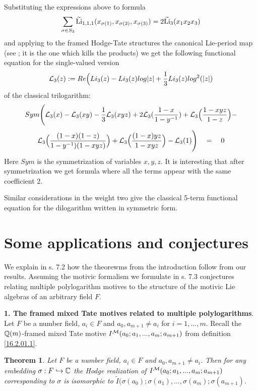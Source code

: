\documentclass[10pt]{article}
\newtheorem{theorem}{Theorem}[section]
\begin{document}
Substituting the expressions above to  formula
$$%
\sum _{\sigma \in S_{3}} {{\widetilde {\rm Li}}}_{1,1,1}(x_{\sigma(1)},x_{\sigma(2)},
x_{\sigma(3)}) = 2 {{\widetilde {\rm Li}}}_{3}(x_1 x_2 x_3) 
$$%
and applying to the framed Hodge-Tate structures the canonical Lie-period map (see \cite{BD1}; it is 
the one which kills the products)
we get the following functional equation for the single-valued version 
$$
{\cal L}_3(z):= Re\Bigl( Li_3(z) -
 Li_3(z)log|z| + \frac{1}{3} Li_3(z)log^2(|z|)
$$
of the classical trilogarithm:
\begin{equation} \label{3.5*}
Sym\Biggr(  {\cal L}_3 (x) -   {\cal L}_3 (xy) - \frac{1}{3}  {\cal L}_3 (xyz) + 2  {\cal L}_3 (\frac{1-x}{1-y^{-1}}) +   {\cal L}_3 \Bigl(\frac{1-xyz}{1-z}\Bigr) - 
\end{equation}
$$
  {\cal L}_3 \Bigl(
\frac{(1-x)(1-z)}{1-y^{-1})(1-xyz)}\Bigr) +   {\cal L}_3 \Bigr(\frac
{(1-x)yz}{1-xyz}\Bigr) - {\cal L}_3(1) \Biggr) \quad = \quad 0
$$
Here $Sym$ is the symmetrization of variables $x,y,z$. It is
interesting that after symmetrization we get formula where all
the terms appear with the same coefficient $2$.


Similar considerations in the weight two give the classical 
 5-term functional equation for the dilogarithm written in symmetric form.


\section{Some applications and conjectures}
 

We explain in s. 7.2 how the theorewms from the introduction follow from our results. 
Assuming the motivic formalism we formulate in s. 7.3 
 conjectures relating multiple polylogarithm motives to the structure of
 the motivic Lie algebras of an 
arbitrary field $F$. 


{\bf 1. The framed mixed Tate  motives  related  to multiple polylogarithms}. Let $F$ be  a number field,   $a_i \in F$ 
 and $a_0, a_{m+1}  \not = a_i$ for $i=1, ..., m$. Recall 
the ${\mathbb Q}(m)$-framed mixed Tate motive $I^{\cal M}(a_0; a_1, ..., a_m; a_{m+1})$ 
from definition \ref{16.2.01.1}. 
\begin{theorem} \label{14.1.01.1}   Let $F$ be  a number field,   $a_i \in F$ 
 and $a_0, a_{m+1}  \not = a_i$. Then 
for any embedding $\sigma: F \hookrightarrow {\mathbb C}$ the  Hodge realization of 
$I^{\cal M}(a_0; a_1, ..., a_m; a_{m+1})$ corresponding to $\sigma$
is isomorphic to 
$\widetilde I(\sigma(a_0); \sigma(a_1), ..., \sigma(a_m); \sigma(a_{m+1})$.
\end{theorem}
\end{document}
